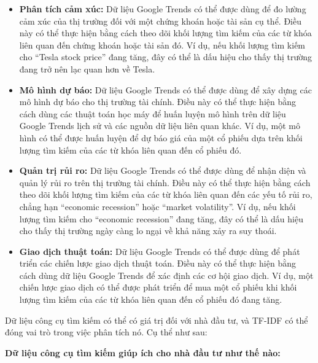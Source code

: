 \begin{itemize}
  \item \textbf{Phân tích cảm xúc:} Dữ liệu Google Trends có thể được dùng để đo lường cảm xúc của thị trường đối với một chứng khoán hoặc tài sản cụ thể. Điều này có thể thực hiện bằng cách theo dõi khối lượng tìm kiếm của các từ khóa liên quan đến chứng khoán hoặc tài sản đó. Ví dụ, nếu khối lượng tìm kiếm cho ``Tesla stock price'' đang tăng, đây có thể là dấu hiệu cho thấy thị trường đang trở nên lạc quan hơn về Tesla.
  \item \textbf{Mô hình dự báo:} Dữ liệu Google Trends có thể được dùng để xây dựng các mô hình dự báo cho thị trường tài chính. Điều này có thể thực hiện bằng cách dùng các thuật toán học máy để huấn luyện mô hình trên dữ liệu Google Trends lịch sử và các nguồn dữ liệu liên quan khác. Ví dụ, một mô hình có thể được huấn luyện để dự báo giá của một cổ phiếu dựa trên khối lượng tìm kiếm của các từ khóa liên quan đến cổ phiếu đó.
  \item \textbf{Quản trị rủi ro:} Dữ liệu Google Trends có thể được dùng để nhận diện và quản lý rủi ro trên thị trường tài chính. Điều này có thể thực hiện bằng cách theo dõi khối lượng tìm kiếm của các từ khóa liên quan đến các yếu tố rủi ro, chẳng hạn ``economic recession'' hoặc ``market volatility''. Ví dụ, nếu khối lượng tìm kiếm cho ``economic recession'' đang tăng, đây có thể là dấu hiệu cho thấy thị trường ngày càng lo ngại về khả năng xảy ra suy thoái.
  \item \textbf{Giao dịch thuật toán:} Dữ liệu Google Trends có thể được dùng để phát triển các chiến lược giao dịch thuật toán. Điều này có thể thực hiện bằng cách dùng dữ liệu Google Trends để xác định các cơ hội giao dịch. Ví dụ, một chiến lược giao dịch có thể được phát triển để mua một cổ phiếu khi khối lượng tìm kiếm của các từ khóa liên quan đến cổ phiếu đó đang tăng.
\end{itemize}

Dữ liệu công cụ tìm kiếm có thể có giá trị đối với nhà đầu tư, và TF-IDF có thể đóng vai trò trong việc phân tích nó. Cụ thể như sau:

\textbf{Dữ liệu công cụ tìm kiếm giúp ích cho nhà đầu tư như thế nào:}

